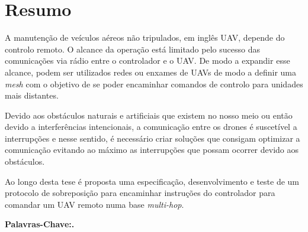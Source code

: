\chapter*{Resumo}

A manutenção de veículos aéreos não tripulados, em inglês UAV, depende do controlo remoto. O alcance da operação está limitado pelo sucesso das comunicações via rádio entre o controlador e o UAV. De modo a expandir esse alcance, podem ser utilizados redes ou enxames de UAVs de modo a definir uma \textit{mesh} com o objetivo de se poder encaminhar comandos de controlo para unidades mais distantes.

Devido aos obstáculos naturais e artificiais que existem no nosso meio ou então devido a interferências intencionais, a comunicação entre os drones é suscetível a interrupções e nesse sentido, é necessário criar soluções que consigam optimizar a comunicação evitando ao máximo as interrupções que possam ocorrer devido aos obstáculos.

Ao longo desta tese é proposta uma especificação, desenvolvimento e teste de um protocolo de sobreposição para encaminhar instruções do controlador para comandar um UAV remoto numa base \textit{multi-hop}.\newline 

\noindent\textbf{Palavras-Chave:. }%
\makeatletter
\@keywordsPT
\makeatother